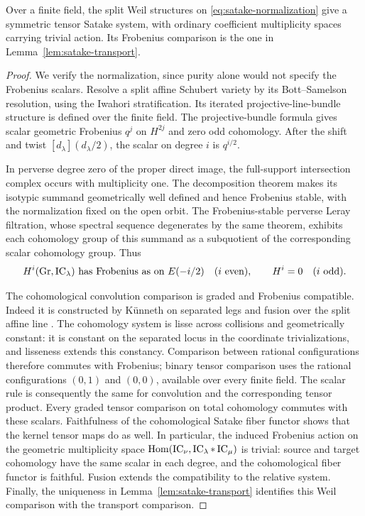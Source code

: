 \begin{lemma}\label{lem:normalized-weil-satake}
Over a finite field, the split Weil structures on
\eqref{eq:satake-normalization} give a symmetric tensor Satake system,
with ordinary coefficient multiplicity spaces carrying trivial action.
Its Frobenius comparison is the one in
Lemma~\ref{lem:satake-transport}.
\end{lemma}

\begin{proof}
We verify the normalization, since purity alone would not specify the
Frobenius scalars. Resolve a split affine Schubert variety by its
Bott--Samelson resolution, using the Iwahori stratification. Its iterated
projective-line-bundle structure is defined over the finite field. The
projective-bundle formula gives scalar geometric Frobenius $q^j$ on
$H^{2j}$ and zero odd cohomology. After the shift and twist
$[d_\lambda](d_\lambda/2)$, the scalar on degree $i$ is $q^{i/2}$.

In perverse degree zero of the proper direct image, the full-support
intersection complex occurs with multiplicity one. The decomposition
theorem \cite[Theorems~5.3.8 and~5.4.5]{BBD} makes its isotypic summand geometrically well defined and hence
Frobenius stable, with the normalization fixed on the open orbit. The
Frobenius-stable perverse Leray filtration, whose spectral sequence
degenerates by the same theorem, exhibits each cohomology group of this
summand as a subquotient of the corresponding scalar cohomology group.
Thus
\[
 H^i(\operatorname{Gr},\operatorname{IC}_\lambda)\text{ has Frobenius as on }E(-i/2)
 \quad(i\text{ even}),\qquad H^i=0\quad(i\text{ odd}).
\]

The cohomological convolution comparison is graded and Frobenius
compatible. Indeed it is constructed by K\"unneth on separated legs and
fusion over the split affine line
\cite[Lemma~6.1, Equations~(6.2a)--(6.2c), and Section~14]{MV}.
The cohomology system is lisse across
collisions and geometrically constant: it is constant on the separated
locus in the coordinate trivializations, and lisseness extends this
constancy. Comparison between rational configurations therefore commutes
with Frobenius; binary tensor comparison uses the rational configurations
$(0,1)$ and $(0,0)$, available over every finite field.
The scalar rule is consequently the same for convolution
and the corresponding tensor product. Every graded tensor comparison on
total cohomology commutes with these scalars. Faithfulness of the
cohomological Satake fiber functor shows that the kernel tensor maps do
as well. In particular, the induced Frobenius action on the geometric
multiplicity space $\operatorname{Hom}(\operatorname{IC}_\nu,\operatorname{IC}_\lambda*\operatorname{IC}_\mu)$ is trivial:
source and target cohomology have the same scalar in each degree,
and the cohomological fiber functor is faithful.
Fusion extends the compatibility to the relative system.
Finally, the uniqueness in Lemma~\ref{lem:satake-transport} identifies
this Weil comparison with the transport comparison.
\end{proof}

